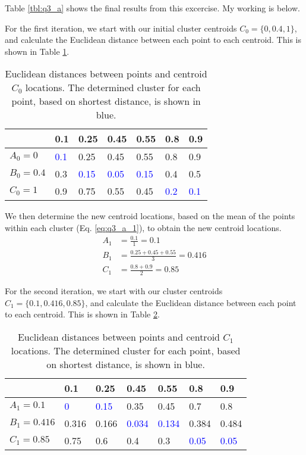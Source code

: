 Table \ref{tbl:q3_a} shows the final results from this excercise. My working is below.

For the first iteration, we start with our initial cluster centroids $C_0 = \{0, 0.4, 1\}$, and calculate the Euclidean distance between each point to each centroid. This is shown in Table \ref{tbl:q3_a_1}.

\begin{table}[h]
  \centering
  \begin{tabular}{|l|l|l|l|l|l|l|}
    \hline
           & \textbf{0.1} & \textbf{0.25} & \textbf{0.45} & \textbf{0.55} & \textbf{0.8} & \textbf{0.9} \\ \hline
    $A_0 =0$   & \textcolor{blue}{0.1} & 0.25 & 0.45 &0.55  &0.8  & 0.9 \\ \hline
    $B_0 =0.4$ & 0.3 & \textcolor{blue}{0.15} & \textcolor{blue}{0.05}  & \textcolor{blue}{0.15} & 0.4  & 0.5 \\ \hline
    $C_0 =1$  & 0.9 &0.75  &0.55  &0.45    &\textcolor{blue}{0.2}   & \textcolor{blue}{0.1} \\ \hline
  \end{tabular}
  \caption{Euclidean distances between points and centroid $C_0$ locations. The determined cluster for each point, based on shortest distance, is shown in blue.}
  \label{tbl:q3_a_1}
\end{table}

We then determine the new centroid locations, based on the mean of the points within each cluster (Eq. \ref{eq:q3_a_1}), to obtain the new centroid locations.
\begin{align}
  A_1 &= \frac{0.1}{1} = 0.1 \nonumber \\
  B_1 &= \frac{0.25+0.45+0.55}{3} = 0.416 \nonumber \\
  C_1 &= \frac{0.8+0.9}{2} = 0.85\label{eq:q3_a_1}
\end{align}

For the second iteration, we start with our cluster centroids $C_1 = \{0.1, 0.416, 0.85\}$, and calculate the Euclidean distance between each point to each centroid. This is shown in Table \ref{tbl:q3_a_2}.

\begin{table}[h]
  \centering
  \begin{tabular}{|l|l|l|l|l|l|l|}
    \hline
           & \textbf{0.1} & \textbf{0.25} & \textbf{0.45} & \textbf{0.55} & \textbf{0.8} & \textbf{0.9} \\ \hline
    $A_1 =0.1$   & \textcolor{blue}{0} & \textcolor{blue}{0.15} & 0.35 &0.45  &0.7  & 0.8 \\ \hline
    $B_1 =0.416$ & 0.316 & 0.166 & \textcolor{blue}{0.034}  & \textcolor{blue}{0.134} & 0.384  & 0.484 \\ \hline
    $C_1 =0.85$  & 0.75 &0.6  &0.4  &0.3 &\textcolor{blue}{0.05} & \textcolor{blue}{0.05} \\ \hline
  \end{tabular}
  \caption{Euclidean distances between points and centroid $C_1$ locations. The determined cluster for each point, based on shortest distance, is shown in blue.}
  \label{tbl:q3_a_2}
\end{table}

